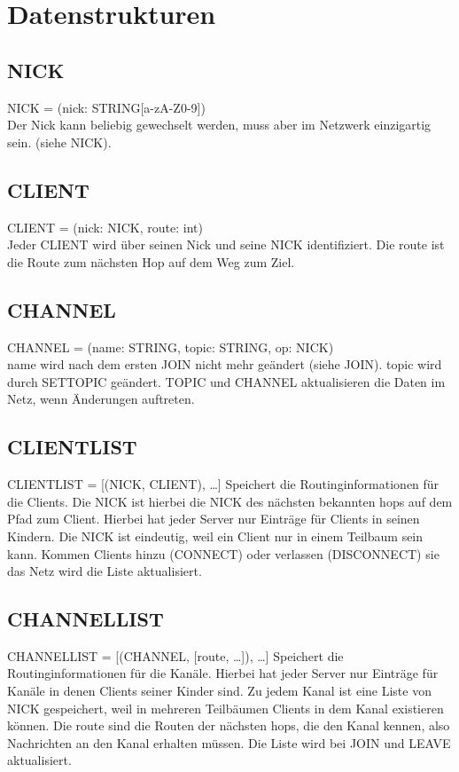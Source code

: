 \documentclass{article}
\begin{document}
\section{Datenstrukturen}

\subsection{NICK}

NICK = (nick: STRING[a-zA-Z0-9])\\
Der Nick kann beliebig gewechselt werden, muss aber im Netzwerk einzigartig sein. (siehe NICK).

\subsection{CLIENT}

CLIENT = (nick: NICK, route: int)\\
Jeder CLIENT wird über seinen Nick und seine NICK identifiziert. Die route ist die Route zum nächsten Hop auf dem Weg zum Ziel.

\subsection{CHANNEL}

CHANNEL = (name: STRING, topic: STRING, op: NICK)\\
name wird nach dem ersten JOIN nicht mehr geändert (siehe JOIN). topic wird durch SETTOPIC geändert. TOPIC und CHANNEL aktualisieren die Daten im Netz, wenn Änderungen auftreten.

\subsection{CLIENTLIST}

CLIENTLIST = [(NICK, CLIENT), \ldots]
Speichert die Routinginformationen für die Clients. Die NICK ist hierbei die NICK des nächsten bekannten hops auf dem Pfad zum Client. Hierbei hat jeder Server nur Einträge für Clients in seinen Kindern. Die NICK ist eindeutig, weil ein Client nur in einem Teilbaum sein kann. Kommen Clients hinzu (CONNECT) oder verlassen (DISCONNECT) sie das Netz wird die Liste aktualisiert.

\subsection{CHANNELLIST}

CHANNELLIST = [(CHANNEL, [route, \ldots]), \ldots]
Speichert die Routinginformationen für die Kanäle. Hierbei hat jeder Server nur Einträge für Kanäle in denen Clients seiner Kinder sind. Zu jedem Kanal ist eine Liste von NICK gespeichert, weil in mehreren Teilbäumen Clients in dem Kanal existieren können. Die route sind die Routen der nächsten hops, die den Kanal kennen, also Nachrichten an den Kanal erhalten müssen. Die Liste wird bei JOIN und LEAVE aktualisiert.
\end{document}
